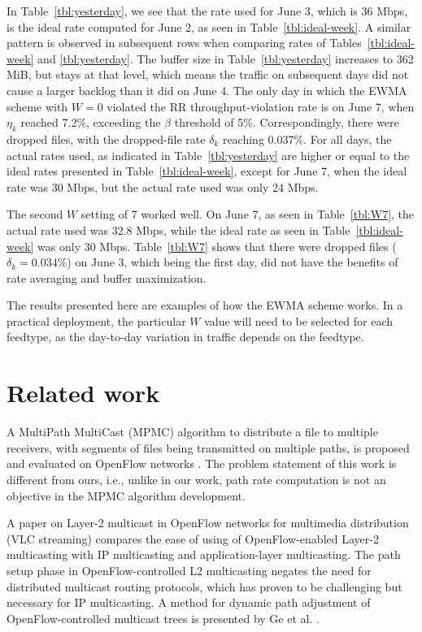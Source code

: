 In Table~\ref{tbl:yesterday}, we see that the rate used for June 3, which is 36 Mbps, is the  ideal rate computed for June 2, as seen in Table~\ref{tbl:ideal-week}. A similar pattern is observed in subsequent rows when comparing rates of Tables~\ref{tbl:ideal-week} and \ref{tbl:yesterday}. The
buffer size in Table~\ref{tbl:yesterday} increases to 362 MiB, but
stays at that level, which means the traffic on subsequent days did
not cause a larger backlog than it did on June 4. The only day
in which the EWMA scheme with $W=0$ violated the RR throughput-violation
rate is on June 7, when $\eta_k$ reached 7.2\%, exceeding the $\beta$
threshold of 5\%. Correspondingly, there were dropped files, with the dropped-file rate $\delta_k$ reaching 0.037\%. For
all days, the actual rates used, as indicated in Table~\ref{tbl:yesterday}
are higher or equal to the ideal rates presented in
Table~\ref{tbl:ideal-week}, except for June 7, when the ideal rate
was 30 Mbps, but the actual rate used was only 24 Mbps.

The second $W$ setting of 7 worked well. On June 7, as seen in Table~\ref{tbl:W7}, the actual rate used was 32.8 Mbps, while
the ideal rate as seen in Table~\ref{tbl:ideal-week} was only 30 Mbps.
Table~\ref{tbl:W7} shows that there were dropped files ($\delta_k = 0.034\%$) on June 3, which being the first day, did not have the benefits of rate averaging and buffer maximization.


The results presented here are examples of how the EWMA scheme works.
In a practical deployment, the particular $W$ value will need to be
selected for each feedtype, as the day-to-day variation in traffic
depends on the feedtype.

\section{Related work}
A MultiPath MultiCast (MPMC) algorithm to distribute a file to multiple receivers, with segments of files being transmitted
on multiple paths, is proposed and evaluated on OpenFlow networks \cite{6630542}.
The problem statement of this work is different from ours, i.e., unlike in our work, path rate computation is not an objective in the MPMC algorithm development.

A paper on Layer-2 multicast in OpenFlow networks for multimedia distribution
(VLC streaming) \cite{6799481} compares the ease of using of OpenFlow-enabled
Layer-2 multicasting with IP multicasting and application-layer multicasting.
The path setup phase in OpenFlow-controlled L2 multicasting negates the need for distributed multicast routing protocols, which has proven to be challenging but necessary for IP multicasting. A method for dynamic path adjustment of OpenFlow-controlled multicast trees is presented by Ge et al. \cite{6681003}.


